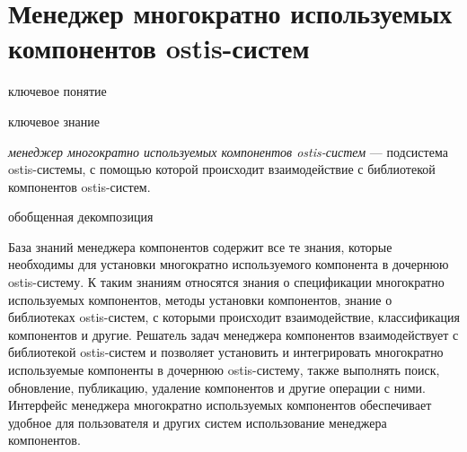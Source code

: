 \section{Менеджер многократно используемых компонентов ostis-систем}
\label{ostis_library_component_manager}

\begin{SCn}
\begin{scnrelfromlist}{ключевое понятие}
\end{scnrelfromlist}
\end{SCn}

\bigskip

\begin{SCn}
\begin{scnrelfromlist}{ключевое знание}
\end{scnrelfromlist}
\end{SCn}

\bigskip

\textit{менеджер многократно используемых компонентов ostis-систем} --- подсистема ostis-системы, с помощью которой происходит взаимодействие с библиотекой компонентов ostis-систем.

\begin{SCn}
\begin{scnrelfromset}{обобщенная декомпозиция}
\end{scnrelfromset}
\end{SCn}

База знаний менеджера компонентов содержит все те знания, которые необходимы для установки многократно используемого компонента в дочернюю ostis-систему. К таким знаниям относятся знания о спецификации многократно используемых компонентов, методы установки компонентов, знание о  библиотеках ostis-систем, с которыми происходит взаимодействие, классификация компонентов и другие. Решатель задач менеджера компонентов взаимодействует с библиотекой ostis-систем и позволяет установить и интегрировать многократно используемые компоненты в дочернюю ostis-систему, также выполнять поиск, обновление, публикацию, удаление компонентов и другие операции с ними. Интерфейс менеджера многократно используемых компонентов обеспечивает удобное для пользователя и других систем использование менеджера компонентов.

